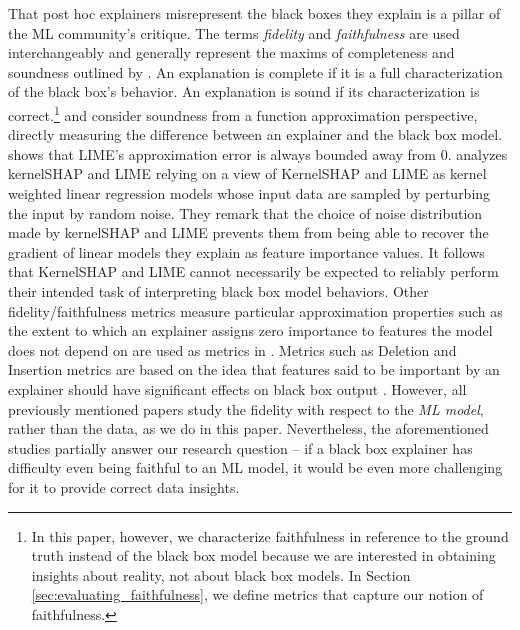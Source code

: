 \documentclass[mnsc,blindrev]{informs3}
\begin{document}
    
        That post hoc explainers misrepresent the black boxes they explain is a pillar of the ML community's critique. The terms \emph{fidelity} and \emph{faithfulness} are used interchangeably and generally represent the maxims of completeness and soundness outlined by \cite{zhou21evaluating}. An explanation is complete if it is a full characterization of the black box's behavior. An explanation is sound if its characterization is correct.\footnote{In this paper, however, we characterize faithfulness in reference to the ground truth instead of the black box model because we are interested in obtaining insights about reality, not about black box models. In Section \ref{sec:evaluating_faithfulness}, we define metrics that capture our notion of faithfulness.} 
    \cite{garreau2020looking} and \cite{han22which} consider soundness from a function approximation perspective, directly measuring the difference between an explainer  and the black box model. \cite{garreau2020looking} shows that LIME's approximation error is always bounded away from 0. \cite{han22which} analyzes kernelSHAP and LIME relying on a view of KernelSHAP and LIME as kernel weighted linear regression models whose input data are sampled by perturbing the input by random noise. They remark that the choice of noise distribution made by kernelSHAP and LIME prevents them from being able to recover the gradient of linear models they explain as feature importance values. It follows that KernelSHAP and LIME cannot necessarily be expected to reliably perform their intended task of interpreting black box model behaviors. 
Other fidelity/faithfulness metrics measure particular approximation properties such as the extent to which an explainer assigns zero importance to features the model does not depend on are used as metrics in \cite{nguyen2020quantitative}. Metrics such as Deletion and Insertion metrics are based on the idea that features said to be important by an explainer should have significant effects on black box output \citep{deyoung20eraser,nguyen2020quantitative,alvarez18robustness,luss2021leveraging}. However, all previously mentioned papers study the fidelity with respect to the \textit{ML model}, rather than the data, as we do in this paper. Nevertheless, the aforementioned studies partially answer our research question -- if a black box explainer has difficulty even being faithful to an ML model, it would be even more challenging for it to provide correct data insights.
    
\end{document}
